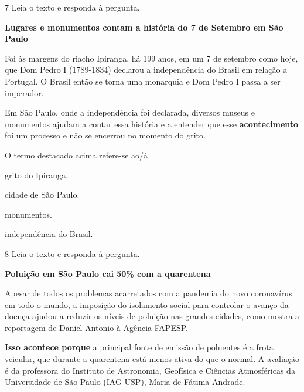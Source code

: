 \begin{myquote}
\begin{myescolha}
\num{7} Leia o texto e responda à pergunta.

\begin{myquote}
\textbf{Lugares e monumentos contam a história do 7 de Setembro em São
Paulo}

Foi às margens do riacho Ipiranga, há 199 anos, em um 7 de setembro como
hoje, que Dom Pedro I (1789-1834) declarou a independência do Brasil em
relação a Portugal. O Brasil então se torna uma monarquia e Dom Pedro I
passa a ser imperador.

Em São Paulo, onde a independência foi declarada, diversos museus e
monumentos ajudam a contar essa história e a entender que esse
\textbf{acontecimento} foi um processo e não se encerrou no momento do
grito.

\end{myquote}

O termo destacado acima refere-se ao/à

\begin{escolha}
  \item grito do Ipiranga.

  \item cidade de São Paulo.

  \item monumentos.

  \item independência do Brasil.
\end{escolha}

\num{8} Leia o texto e responda à pergunta.

\begin{myquote}
\textbf{Poluição em São Paulo cai 50\% com a quarentena}

Apesar de todos os problemas acarretados com a pandemia do novo
coronavírus em todo o mundo, a imposição do isolamento social para
controlar o avanço da doença ajudou a reduzir os níveis de poluição nas
grandes cidades, como mostra a reportagem de Daniel Antonio à Agência
FAPESP.

\textbf{Isso acontece porque} a principal fonte de emissão de poluentes é a
frota veicular, que durante a quarentena está menos ativa do que o
normal. A avaliação é da professora do Instituto de Astronomia,
Geofísica e Ciências Atmosféricas da Universidade de São Paulo
(IAG-USP), Maria de Fátima Andrade.


\end{myquote}
\end{myescolha}
\end{myquote}
